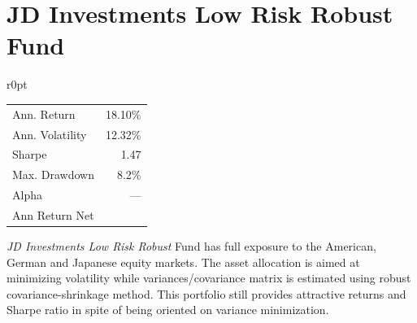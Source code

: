 \documentclass[11pt, parskip=full, DIV=14]{scrreprt}
\begin{document}
\newpage\section*{JD Investments Low Risk Robust Fund}
\begin{mywraptable}{r}{0pt}
  \begin{tabular}{lr}
  \toprule
  Ann. Return & 18.10\%\\
  Ann. Volatility & 12.32\%\\
  Sharpe & 1.47\\
  Max. Drawdown& 8.2\%\\
  Alpha & ---\\
  Ann Return Net & \\
  \bottomrule
  \end{tabular}
\end{mywraptable}
\textit{JD Investments Low Risk Robust} Fund has full exposure to the American, German and Japanese equity markets.
The asset allocation is aimed at minimizing volatility while variances/covariance matrix is estimated using robust covariance-shrinkage method.
This portfolio still provides attractive returns and Sharpe ratio in spite of being oriented on variance minimization.

\begin{figure}[H]
\end{figure}
\end{document}
